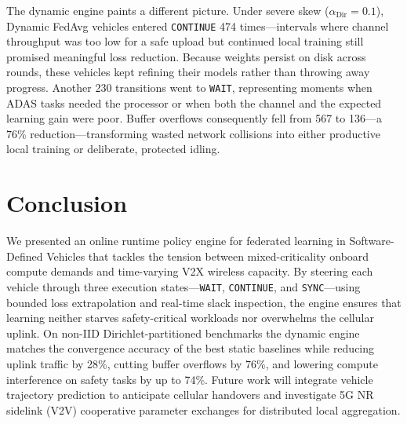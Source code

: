 \documentclass[conference]{IEEEtran}
\begin{document}
The dynamic engine paints a different picture. Under severe skew ($\alpha_{\text{Dir}} = 0.1$), Dynamic FedAvg vehicles entered \texttt{CONTINUE} 474 times---intervals where channel throughput was too low for a safe upload but continued local training still promised meaningful loss reduction. Because weights persist on disk across rounds, these vehicles kept refining their models rather than throwing away progress. Another 230 transitions went to \texttt{WAIT}, representing moments when ADAS tasks needed the processor or when both the channel and the expected learning gain were poor. Buffer overflows consequently fell from 567 to 136---a 76\% reduction---transforming wasted network collisions into either productive local training or deliberate, protected idling.

\section{Conclusion}
We presented an online runtime policy engine for federated learning in Software-Defined Vehicles that tackles the tension between mixed-criticality onboard compute demands and time-varying V2X wireless capacity. By steering each vehicle through three execution states---\texttt{WAIT}, \texttt{CONTINUE}, and \texttt{SYNC}---using bounded loss extrapolation and real-time slack inspection, the engine ensures that learning neither starves safety-critical workloads nor overwhelms the cellular uplink. On non-IID Dirichlet-partitioned benchmarks the dynamic engine matches the convergence accuracy of the best static baselines while reducing uplink traffic by 28\%, cutting buffer overflows by 76\%, and lowering compute interference on safety tasks by up to 74\%. Future work will integrate vehicle trajectory prediction to anticipate cellular handovers and investigate 5G NR sidelink (V2V) cooperative parameter exchanges for distributed local aggregation.
\end{document}
